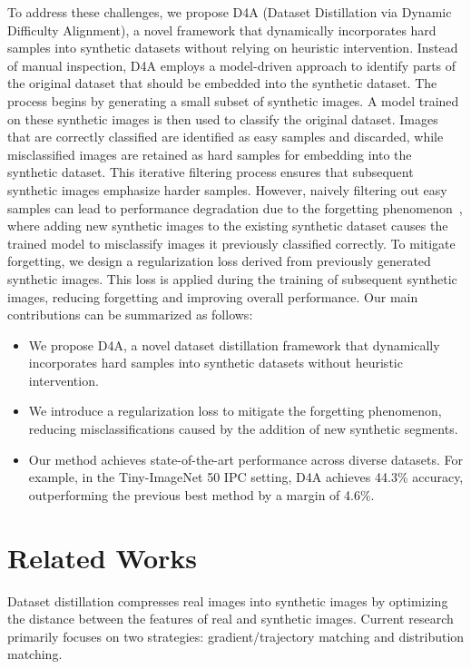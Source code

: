 \documentclass{article}
\theoremstyle{plain}
\theoremstyle{definition}
\theoremstyle{remark}
\begin{document}
To address these challenges, we propose D4A (Dataset Distillation via Dynamic Difficulty Alignment),
a novel framework that dynamically incorporates hard samples into synthetic datasets without
relying on heuristic intervention. Instead of manual inspection, D4A employs
a model-driven approach to identify parts of the original dataset that should be embedded
into the synthetic dataset.
The process begins by generating a small subset of synthetic images.
A model trained on these synthetic images is then used to classify the original dataset.
Images that are correctly classified are identified as easy samples and discarded,
while misclassified images are retained as hard samples for embedding into the synthetic dataset.
This iterative filtering process ensures that subsequent synthetic images emphasize harder samples.
However, naively filtering out easy samples can lead to performance degradation due
to the forgetting phenomenon~\cite{}, where adding new synthetic images to the existing synthetic
dataset causes the trained model to misclassify images it previously classified correctly.
To mitigate forgetting, we design a regularization loss derived from previously generated
synthetic images. This loss is applied during the training of subsequent synthetic images,
reducing forgetting and improving overall performance.
Our main contributions can be summarized as follows:
\begin{itemize}
    \item We propose D4A, a novel dataset distillation framework that dynamically incorporates hard samples into synthetic datasets without heuristic intervention.  
    \item We introduce a regularization loss to mitigate the forgetting phenomenon, reducing misclassifications caused by the addition of new synthetic segments.  
    \item Our method achieves state-of-the-art performance across diverse datasets. For example, in the Tiny-ImageNet 50 IPC setting, D4A achieves 44.3\% accuracy, outperforming the previous best method by a margin of 4.6\%.  
\end{itemize}


\section{Related Works}
Dataset distillation compresses real images into synthetic images by optimizing the distance between the features of real and synthetic images.
Current research primarily focuses on two strategies: gradient/trajectory matching and distribution matching.
\end{document}
